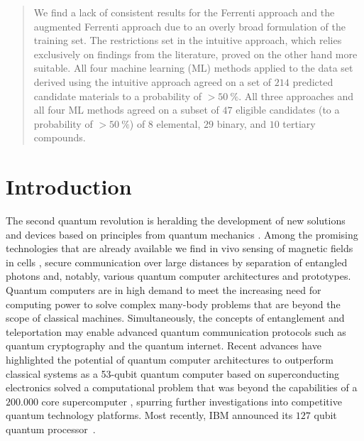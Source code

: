 \documentclass[superscriptaddress,unsortedaddress,
 amsmath,amssymb,
 aps,
]{revtex4-2}
\begin{document}
\begin{abstract}
We find a lack of consistent results for the Ferrenti approach and the augmented Ferrenti approach due to an overly broad formulation of the training set. The restrictions set in the intuitive approach, which relies exclusively on findings from the literature, proved on the other hand more suitable.  
All four machine learning (ML) methods applied to the data set derived using the intuitive approach agreed on a set of $214$ predicted candidate materials to a probability of $>50 \ \%$. 
All three approaches and all four ML methods agreed on a subset of $47$ eligible candidates (to a probability of $>50 \ \%$) of $8$ elemental, $29$ binary, and $10$ tertiary compounds.

\end{abstract}



\maketitle

\section*{Introduction}
The second quantum revolution is heralding the development of new solutions and devices based on principles from quantum mechanics \cite{Acin2018}. Among the promising technologies that are already available we find in vivo sensing of magnetic fields in cells \cite{Lesage_2013}, secure communication over large distances by separation of entangled photons \cite{Ursin2007} and, notably, various quantum computer architectures and prototypes. 
Quantum computers are in high demand to meet the increasing need for computing power to solve complex many-body problems that are beyond the scope of classical machines.   
Simultaneously, the concepts of entanglement and teleportation may enable advanced quantum communication protocols such as quantum cryptography and the quantum internet.  
Recent advances have highlighted the potential of quantum computer architectures to outperform classical systems as a 53-qubit quantum computer based on superconducting electronics solved a computational problem that was beyond the capabilities of a $200.000$ core supercomputer \cite{Arute_2019}, spurring further investigations into competitive quantum technology platforms. Most recently, IBM announced its $127$ qubit quantum processor~\cite{IBM2021}.
\end{document}
